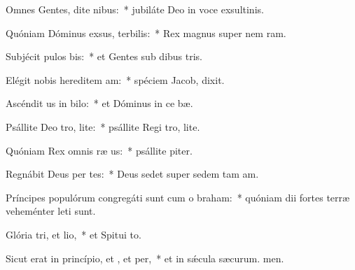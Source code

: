 \item Omnes Gentes, dite nibus:~* jubiláte Deo in voce exsultinis.
\item Quóniam Dóminus exsus, terbilis:~* Rex magnus super nem ram.
\item Subjécit pulos bis:~* et Gentes sub dibus tris.
\item Elégit nobis hereditem am:~* spéciem Jacob,  dixit.
\item Ascéndit us in bilo:~* et Dóminus in ce bæ.
\item Psállite Deo tro, lite:~* psállite Regi tro, lite.
\item Quóniam Rex omnis ræ us:~* psállite piter.
\item Regnábit Deus per tes:~* Deus sedet super sedem tam am.
\item Príncipes populórum congregáti sunt cum o braham:~* quóniam dii fortes terræ veheménter leti sunt.
\item Glória tri, et lio,~* et Spitui to.
\item Sicut erat in princípio, et , et per,~* et in sǽcula sæcurum. men.
